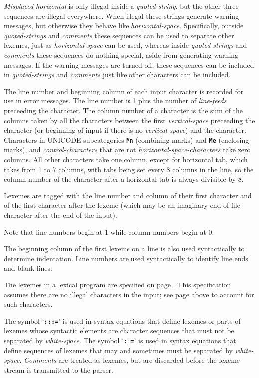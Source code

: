 \documentclass[12pt]{article}
\makeatletter
\newcommand{\TT}[1]{{\tt \bfseries #1}}
\newcommand{\ttmkey}[2]{\TT{#1}\index{#1@{\tt #1}!#2}}
\makeatother
\begin{document}
{\em Misplaced-horizontal} is only illegal inside a {\em quoted-string},
but the other three sequences are illegal everywhere.  When illegal
these strings generate warning messages, but otherwise they behave
like {\em horizontal-space}.  Specifically, outside {\em quoted-strings}
and {\em comments} these sequences can be used to separate other lexemes,
just as {\em horizontal-space} can be used,
whereas inside {\em quoted-strings} and
{\em comments} these sequences do nothing special, aside from generating
warning messages.  If the warning messages are turned off, these
sequences can be included in {\em quoted-strings} and {\em comments}
just like other characters can be included.

The line number and beginning column of each input character is
recorded for use in error messages.  The line number is 1 plus the
number of {\em line-feeds} preceeding the character.  The column
number of a character is the sum of the columns taken by all the
characters between the first {\em vertical-space} preceeding the
character (or beginning of input if there is no {\em vertical-space})
and the character.
Characters in UNICODE subcategories \TT{Mn} (combining marks)
and \TT{Me} (enclosing marks),
and {\em control-characters} that are not
{\em horizontal-space-characters} take zero columns.  All other characters
take one column, except for horizontal tab, which takes from
1 to 7 columns, with tabs being set every 8 columns in the line,
so the column number of the character after a horizontal tab
is always divisible by 8.

Lexemes are tagged with the line number and column of their first
character and of the first character after the lexeme (which may be
an imaginary end-of-file character after the end of the input).

Note that line numbers begin at 1 while column numbers begin at 0.

The beginning column of the first
lexeme on a line is also used syntactically to determine
indentation.  Line numbers are used syntactically to identify line ends
and blank lines.

The lexemes in a lexical program are specified on page
\pageref{LEXEME-PROGRAM-LEXEMES}.  This specification assumes there
are no illegal characters in the input; see page \pageref{ILLEGAL-CHARACTERS}
above to account for such characters.

The symbol `\ttmkey{:::=}{in syntax equation}' is used in syntax equations
that define lexemes or parts of lexemes whose syntactic elements are
character sequences that must \underline{not} be separated by {\em white-space}.
The symbol `\ttmkey{::=}{in syntax equation}'
is used in syntax equations that define sequences of lexemes that may
and sometimes must be separated by {\em white-space}.
{\em Comments} are treated as lexemes, but are discarded before the
lexeme stream is transmitted to the parser.
\end{document}
